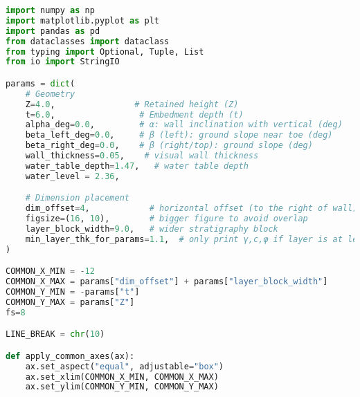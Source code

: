 \begin{lstlisting}[language=Python]
import numpy as np
import matplotlib.pyplot as plt
import pandas as pd
from dataclasses import dataclass
from typing import Optional, Tuple, List
from io import StringIO

params = dict(
    # Geometry
    Z=4.0,                # Retained height (Z)
    t=6.0,                 # Embedment depth (t)
    alpha_deg=0.0,         # α: wall inclination with vertical (deg)
    beta_left_deg=0.0,     # β (left): ground slope near toe (deg)
    beta_right_deg=0.0,    # β (right/top): ground slope (deg)
    wall_thickness=0.05,    # visual wall thickness
    water_table_depth=1.47,   # water table depth
    water_level = 2.36,

    # Dimension placement
    dim_offset=4,            # horizontal offset (to the right of wall) for Z and t dimensions
    figsize=(16, 10),        # bigger figure to avoid overlap      
    layer_block_width=9.0,   # wider stratigraphy block
    min_layer_thk_for_params=1.1,  # only print γ,c,φ if layer is at least this thick [m]
)

COMMON_X_MIN = -12
COMMON_X_MAX = params["dim_offset"] + params["layer_block_width"]
COMMON_Y_MIN = -params["t"]
COMMON_Y_MAX = params["Z"]
fs=8

LINE_BREAK = chr(10)

def apply_common_axes(ax):
    ax.set_aspect("equal", adjustable="box")
    ax.set_xlim(COMMON_X_MIN, COMMON_X_MAX)
    ax.set_ylim(COMMON_Y_MIN, COMMON_Y_MAX)
\end{lstlisting}





